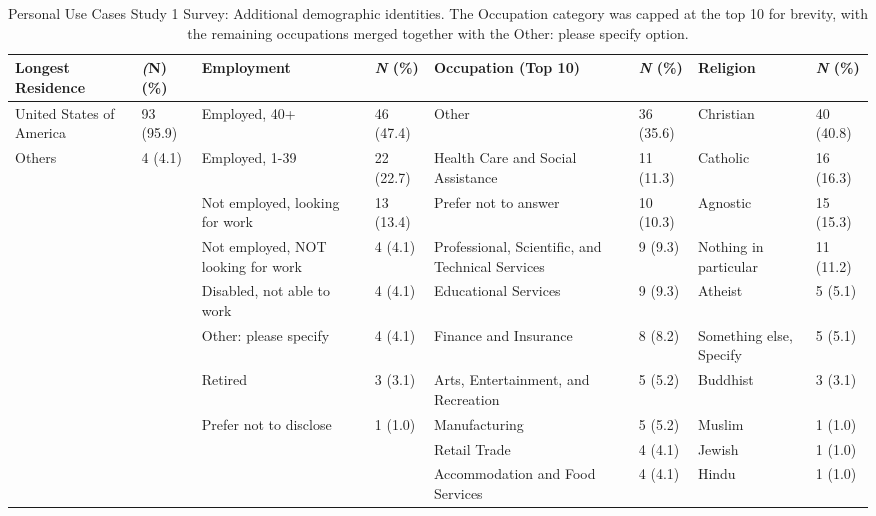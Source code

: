 \begin{table*}[htpb]
    \centering
    \footnotesize
    \begin{tabularx}{\textwidth}{Xl|Xl|Xl|Xl}
    \toprule
        \textbf{Longest Residence} & \textbf{\textit(N) (\%)} & \textbf{Employment} & \textbf{\textit{N} (\%)} & \textbf{Occupation (Top 10)} & \textbf{\textit{N} (\%)} & \textbf{Religion} & \textbf{\textit{N} (\%)} \\
    \midrule
United States of America & 93 (95.9) & Employed, 40+ & 46 (47.4) & Other & 36 (35.6) & Christian & 40 (40.8)\\
Others & 4 (4.1) & Employed, 1-39 & 22 (22.7) & Health Care and Social Assistance & 11 (11.3) & Catholic & 16 (16.3)\\
 &  & Not employed, looking for work & 13 (13.4) & Prefer not to answer & 10 (10.3) & Agnostic & 15 (15.3)\\
 &  & Not employed, NOT looking for work & 4 (4.1) & Professional, Scientific, and Technical Services & 9 (9.3) & Nothing in particular & 11 (11.2)\\
 &  & Disabled, not able to work & 4 (4.1) & Educational Services & 9 (9.3) & Atheist & 5 (5.1)\\
 &  & Other: please specify & 4 (4.1) & Finance and Insurance & 8 (8.2) & Something else, Specify & 5 (5.1)\\
 &  & Retired & 3 (3.1) & Arts, Entertainment, and Recreation & 5 (5.2) & Buddhist & 3 (3.1)\\
 &  & Prefer not to disclose & 1 (1.0) & Manufacturing & 5 (5.2) & Muslim & 1 (1.0)\\
 &  &  &  & Retail Trade & 4 (4.1) & Jewish & 1 (1.0)\\
 &  &  &  & Accommodation and Food Services & 4 (4.1) & Hindu & 1 (1.0)\\
 \bottomrule
    \end{tabularx}
    \caption{Personal Use Cases Study 1 Survey: Additional demographic identities. The Occupation category was capped at the top 10 for brevity, with the remaining occupations merged together with the Other: please specify option.}
    \label{app:demographics-3-personal-p1}
\end{table*}